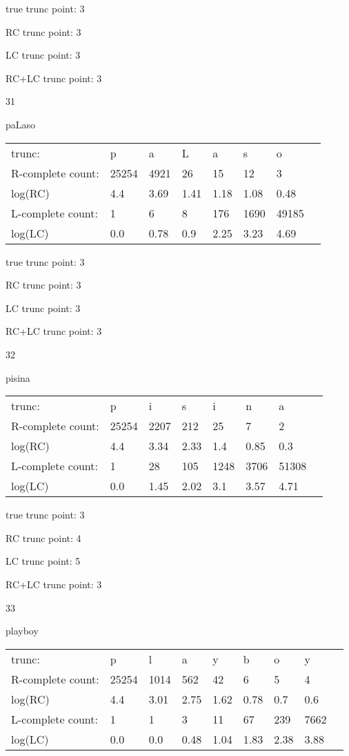 \documentclass{article}
\begin{document}
true trunc point: 3

RC trunc point: 3

LC trunc point: 3

RC+LC trunc point: 3

\vspace{1em}

31

paLaso

\begin{tabular}{l|lllllll}
trunc: & p & a & L & a & s & o & \\ 
R-complete count: & 25254 & 4921 & 26 & 15 & 12 & 3 & \\ 
log(RC) & 4.4 & 3.69 & 1.41 & 1.18 & 1.08 & 0.48 & \\ 
L-complete count: & 1 & 6 & 8 & 176 & 1690 & 49185 & \\ 
log(LC) & 0.0 & 0.78 & 0.9 & 2.25 & 3.23 & 4.69 & \\ 
\end{tabular}

true trunc point: 3

RC trunc point: 3

LC trunc point: 3

RC+LC trunc point: 3

\vspace{1em}

32

pisina

\begin{tabular}{l|lllllll}
trunc: & p & i & s & i & n & a & \\ 
R-complete count: & 25254 & 2207 & 212 & 25 & 7 & 2 & \\ 
log(RC) & 4.4 & 3.34 & 2.33 & 1.4 & 0.85 & 0.3 & \\ 
L-complete count: & 1 & 28 & 105 & 1248 & 3706 & 51308 & \\ 
log(LC) & 0.0 & 1.45 & 2.02 & 3.1 & 3.57 & 4.71 & \\ 
\end{tabular}

true trunc point: 3

RC trunc point: 4

LC trunc point: 5

RC+LC trunc point: 3

\newpage

33

playboy

\begin{tabular}{l|llllllll}
trunc: & p & l & a & y & b & o & y & \\ 
R-complete count: & 25254 & 1014 & 562 & 42 & 6 & 5 & 4 & \\ 
log(RC) & 4.4 & 3.01 & 2.75 & 1.62 & 0.78 & 0.7 & 0.6 & \\ 
L-complete count: & 1 & 1 & 3 & 11 & 67 & 239 & 7662 & \\ 
log(LC) & 0.0 & 0.0 & 0.48 & 1.04 & 1.83 & 2.38 & 3.88 & \\ 
\end{tabular}
\end{document}

